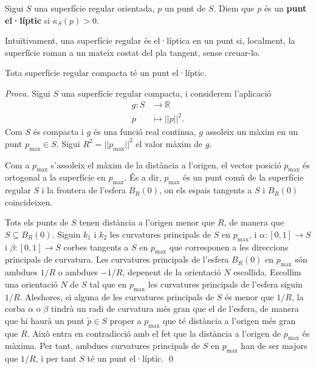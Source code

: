 \begin{defi}
    Sigui $S$ una superfície regular orientada, $p$ un punt de $S$. Diem que $p$ és un \textbf{punt el·líptic} si $\kappa_S(p) > 0$.
\end{defi}

Intuïtivament, una superfície regular és el·líptica en un punt si, localment, la superfície roman a un mateix costat del pla tangent, sense creuar-lo. 

\begin{teo}\label{teo:elliptic_point}
    Tota superfície regular compacta té un punt el·líptic.
\end{teo}
{
    \color{green!50!black}
    \textit{Prova.}
    Sigui $S$ una superfície regular compacta, i considerem l'aplicació 
    \begin{align*}
        g:S&\to\mathbb R\\
        p&\mapsto ||p||^2.
    \end{align*}
    Com $S$ és compacta i $g$ és una funció real contínua, $g$ assoleix un màxim en un punt $p_{\max}\in S$. Sigui $R^2 = ||p_{\max}||^2$ el valor màxim de $g$. 
    
    Com a $p_{\max}$ s'assoleix el màxim de la distància a l'origen, el vector posició $p_{\max}$ és ortogonal a la superfície en $p_{\max}$. És a dir, $p_{\max}$ és un punt comú de la superfície regular $S$ i la frontera de l'esfera $B_{R}(0)$, on els espais tangents a $S$ i $B_{R}(0)$ coincideixen. 

    Tots els punts de $S$ tenen distància a l'origen menor que $R$, de manera que $S\subseteq B_{R}(0)$. Siguin $k_1$ i $k_2$ les curvatures principals de $S$ en $p_{\max}$, i $\alpha:[0,1]\to S$ i $\beta:[0,1]\to S$ corbes tangents a $S$ en $p_{\max}$ que corresponen a les direccions principals de curvatura. Les curvatures principals de l'esfera $B_{R}(0)$ en $p_{\max}$ són ambdues $1/R$ o ambdues $-1/R$, depenent de la orientació $N$ escollida. Escollim una orientació $N$ de $S$ tal que en $p_{\max}$ les curvatures principals de l'esfera siguin $1/R$. Aleshores, si alguna de les curvatures principals de $S$ és menor que $1/R$, la corba $\alpha$ o $\beta$ tindrà un radi de curvatura més gran que el de l'esfera, de manera que hi haurà un punt $\tilde p\in S$ proper a $p_{\max}$ que té distància a l'origen més gran que $R$. Això entra en contradicció amb el fet que la distància a l'origen de $p_{\max}$ és màxima. Per tant, ambdues curvatures principals de $S$ en $p_{\max}$ han de ser majors que $1/R$, i per tant $S$ té un punt el·líptic.
    \qed
}

